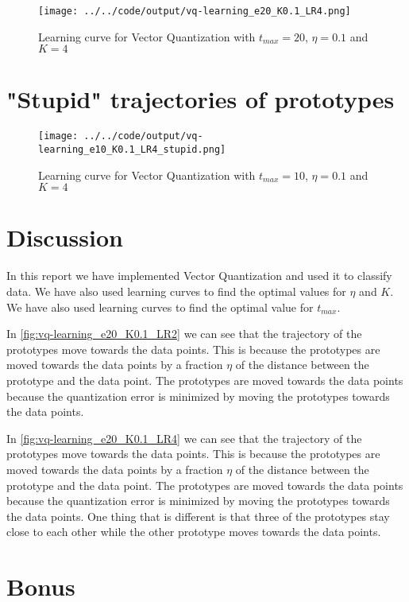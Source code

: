 \documentclass[twoside, a4paper, fleqn, reqno]{article}
\begin{document}
\begin{figure}[H]
	\centering
	\texttt{[image: ../../code/output/vq-learning\_e20\_K0.1\_LR4.png]}
	\caption{Learning curve for Vector Quantization with $t_{max}=20$, $\eta=0.1$ and $K=4$}
	\label{fig:vq-learning_e20_K0.1_LR4}
\end{figure}

\section{"Stupid" trajectories of prototypes}

\begin{figure}[H]
	\centering
	\texttt{[image: ../../code/output/vq-learning\_e10\_K0.1\_LR4\_stupid.png]}
	\caption{Learning curve for Vector Quantization with $t_{max}=10$, $\eta=0.1$ and $K=4$}
	\label{fig:vq-learning_e20_K0.1_LR4_stupid}
\end{figure}

\section{Discussion}

In this report we have implemented Vector Quantization and used it to classify data.
We have also used learning curves to find the optimal values for $\eta$ and $K$.
We have also used learning curves to find the optimal value for $t_{max}$.

In \autoref{fig:vq-learning_e20_K0.1_LR2} we can see that the trajectory of the prototypes move towards the data points.
This is because the prototypes are moved towards the data points by a fraction $\eta$ of the distance between the prototype and the data point.
The prototypes are moved towards the data points because the quantization error is minimized by moving the prototypes towards the data points.

In \autoref{fig:vq-learning_e20_K0.1_LR4} we can see that the trajectory of the prototypes move towards the data points.
This is because the prototypes are moved towards the data points by a fraction $\eta$ of the distance between the prototype and the data point.
The prototypes are moved towards the data points because the quantization error is minimized by moving the prototypes towards the data points.
One thing that is different is that three of the prototypes stay close to each other while the other prototype moves towards the data points.

\section{Bonus}
\end{document}
